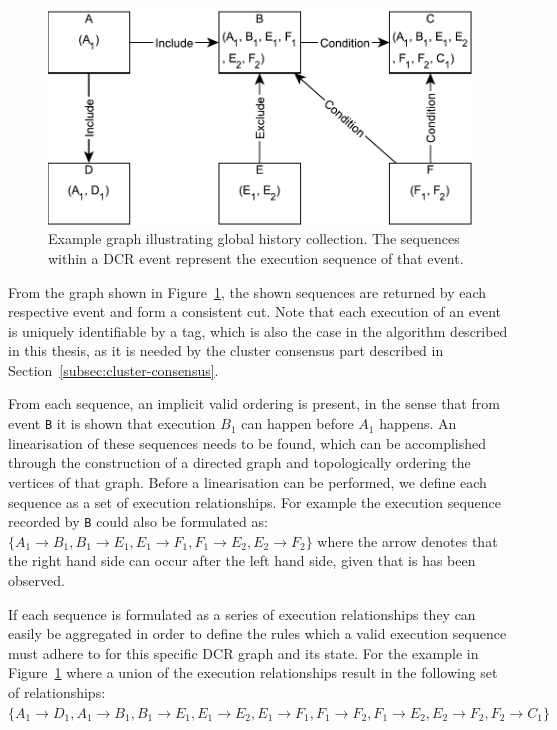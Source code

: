 \documentclass{article}
\begin{document}
	\begin{figure}[ht!]
		\center
		\includegraphics[scale=0.6]{figures/dcr-graphs/global-history-collection-example.pdf}
		\caption{Example graph illustrating global history collection. The sequences within a DCR event represent the execution sequence of that event.}
		\label{fig:global-history-collection-example}
	\end{figure}

	From the graph shown in Figure~\ref{fig:global-history-collection-example}, the shown sequences are returned by each respective event and form a consistent cut.
	Note that each execution of an event is uniquely identifiable by a tag, which is also the case in the algorithm described in this thesis, as it is needed by the cluster consensus part described in Section~\ref{subsec:cluster-consensus}.

	From each sequence, an implicit valid ordering is present, in the sense that from event \texttt{B} it is shown that execution $B_1$ can happen before $A_1$ happens.
	An linearisation of these sequences needs to be found, which can be accomplished through the construction of a directed graph and topologically ordering the vertices of that graph.
	Before a linearisation can be performed, we define each sequence as a set of execution relationships.
	For example the execution sequence recorded by \texttt{B} could also be formulated as: $\{A_1 \rightarrow B_1, B_1 \rightarrow E_1, E_1 \rightarrow F_1, F_1 \rightarrow E_2, E_2 \rightarrow F_2\}$ where the arrow denotes that the right hand side can occur after the left hand side, given that is has been observed.

	If each sequence is formulated as a series of execution relationships they can easily be aggregated in order to define the rules which a valid execution sequence must adhere to for this specific DCR graph and its state.
	For the example in Figure~\ref{fig:global-history-collection-example} where a union of the execution relationships result in the following set of relationships: $\{A_1 \rightarrow D_1, A_1 \rightarrow B_1, B_1 \rightarrow E_1, E_1 \rightarrow E_2, E_1 \rightarrow F_1, F_1 \rightarrow F_2, F_1 \rightarrow E_2, E_2 \rightarrow F_2, F_2 \rightarrow C_1\}$
\end{document}
